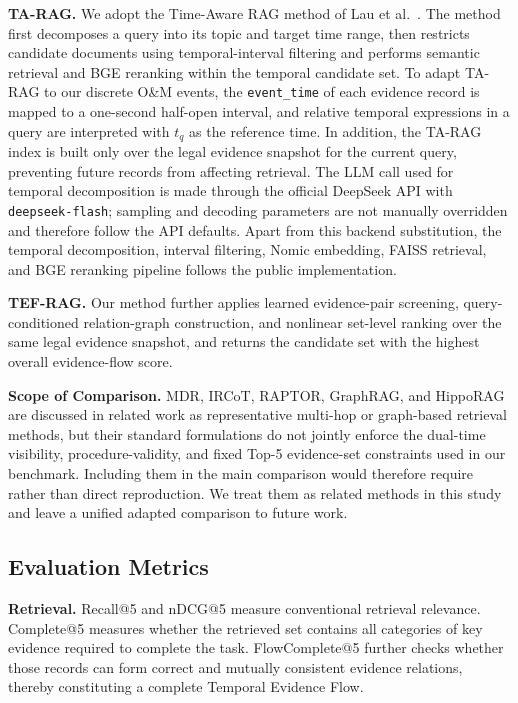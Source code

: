 \textbf{TA-RAG.}
We adopt the Time-Aware RAG method of Lau et al.~\cite{lau2025tarag}. The method first decomposes a query into its topic and target time range, then restricts candidate documents using temporal-interval filtering and performs semantic retrieval and BGE reranking within the temporal candidate set. To adapt TA-RAG to our discrete O\&M events, the \texttt{event\_time} of each evidence record is mapped to a one-second half-open interval, and relative temporal expressions in a query are interpreted with $t_q$ as the reference time. In addition, the TA-RAG index is built only over the legal evidence snapshot for the current query, preventing future records from affecting retrieval. The LLM call used for temporal decomposition is made through the official DeepSeek API with \texttt{deepseek-flash}; sampling and decoding parameters are not manually overridden and therefore follow the API defaults. Apart from this backend substitution, the temporal decomposition, interval filtering, Nomic embedding, FAISS retrieval, and BGE reranking pipeline follows the public implementation.

\textbf{TEF-RAG.}
Our method further applies learned evidence-pair screening, query-conditioned relation-graph construction, and nonlinear set-level ranking over the same legal evidence snapshot, and returns the candidate set with the highest overall evidence-flow score.

\textbf{Scope of Comparison.}
MDR, IRCoT, RAPTOR, GraphRAG, and HippoRAG are discussed in related work as representative multi-hop or graph-based retrieval methods, but their standard formulations do not jointly enforce the dual-time visibility, procedure-validity, and fixed Top-5 evidence-set constraints used in our benchmark. %
Including them in the main comparison would therefore require  rather than direct reproduction. We treat them as related methods in this study and leave a unified adapted comparison to future work.

\subsection{Evaluation Metrics}
\label{sec:metrics}

\textbf{Retrieval.}
Recall@5 and nDCG@5 measure conventional retrieval relevance. Complete@5 measures whether the retrieved set contains all categories of key evidence required to complete the task. FlowComplete@5 further checks whether those records can form correct and mutually consistent evidence relations, thereby constituting a complete Temporal Evidence Flow.

